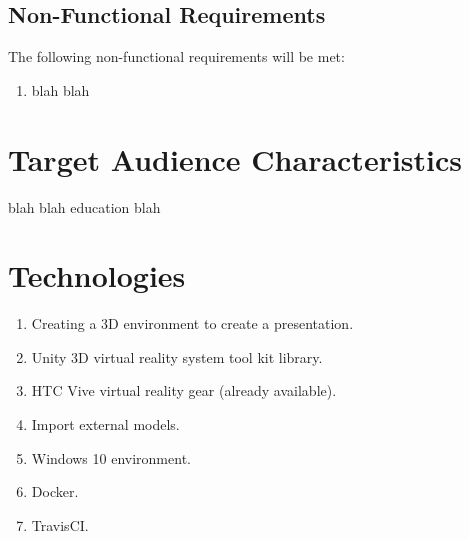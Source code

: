 \documentclass{article}
\begin{document}
	\subsection{Non-Functional Requirements}
	
	The following non-functional requirements will be met:
	
	\begin{enumerate}
			\item blah blah
	\end{enumerate}
	
\section{Target Audience Characteristics}
	
	blah blah education blah

\section{Technologies}
	\begin{enumerate}
		\item Creating a 3D environment to create a presentation.
		\item Unity 3D virtual reality system tool kit library.
		\item HTC Vive virtual reality gear (already available).
		\item Import external models.
		\item Windows 10 environment.
		\item Docker.
		\item TravisCI.	
	\end{enumerate}
	
\end{document}
